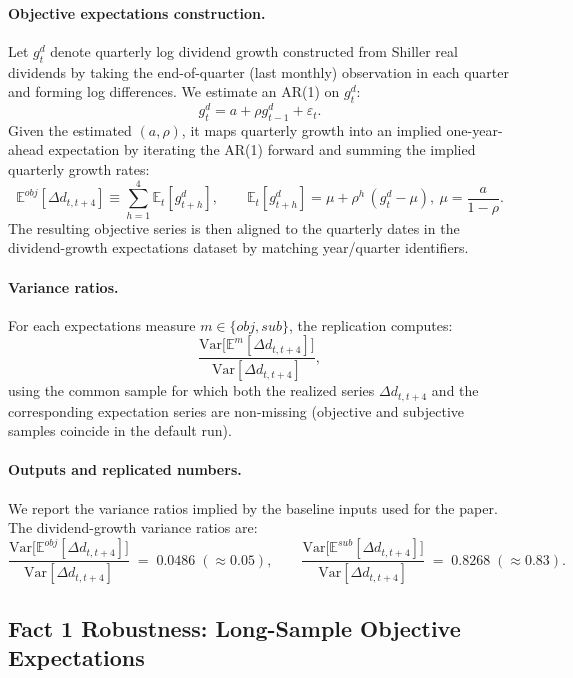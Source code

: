 \paragraph{Objective expectations construction.}
Let \(g^d_t\) denote quarterly log dividend growth constructed from Shiller real dividends by taking the end-of-quarter (last monthly) observation in each quarter and forming log differences. We estimate an AR(1) on \(g^d_t\):
\[
g^d_t = a + \rho g^d_{t-1} + \varepsilon_t.
\]
Given the estimated \((a,\rho)\), it maps quarterly growth into an implied one-year-ahead expectation by iterating the AR(1) forward and summing the implied quarterly growth rates:
\[
\mathbb{E}^{obj}[\Delta d_{t,t+4}] \equiv \sum_{h=1}^{4}\mathbb{E}_t[g^d_{t+h}],
\qquad
\mathbb{E}_t[g^d_{t+h}] = \mu + \rho^h\,(g^d_t-\mu),\ \mu=\frac{a}{1-\rho}.
\]
The resulting objective series is then aligned to the quarterly dates in the dividend-growth expectations dataset by matching year/quarter identifiers.

\paragraph{Variance ratios.}
For each expectations measure \(m\in\{obj,sub\}\), the replication computes:
\[
\frac{\mathrm{Var}\!\bigl[\mathbb{E}^{m}[\Delta d_{t,t+4}]\bigr]}{\mathrm{Var}[\Delta d_{t,t+4}]},
\]
using the common sample for which both the realized series \(\Delta d_{t,t+4}\) and the corresponding expectation series are non-missing (objective and subjective samples coincide in the default run).

\paragraph{Outputs and replicated numbers.}
We report the variance ratios implied by the baseline inputs used for the paper. The dividend-growth variance ratios are:
\[
\frac{\mathrm{Var}\!\bigl[\mathbb{E}^{obj}[\Delta d_{t,t+4}]\bigr]}{\mathrm{Var}[\Delta d_{t,t+4}]} \;=\; 0.0486 \;(\approx 0.05),
\qquad
\frac{\mathrm{Var}\!\bigl[\mathbb{E}^{sub}[\Delta d_{t,t+4}]\bigr]}{\mathrm{Var}[\Delta d_{t,t+4}]} \;=\; 0.8268 \;(\approx 0.83).
\]



\subsection{Fact 1 Robustness: Long-Sample Objective Expectations}\label{app:data_fact1_long_sample_robustness}

